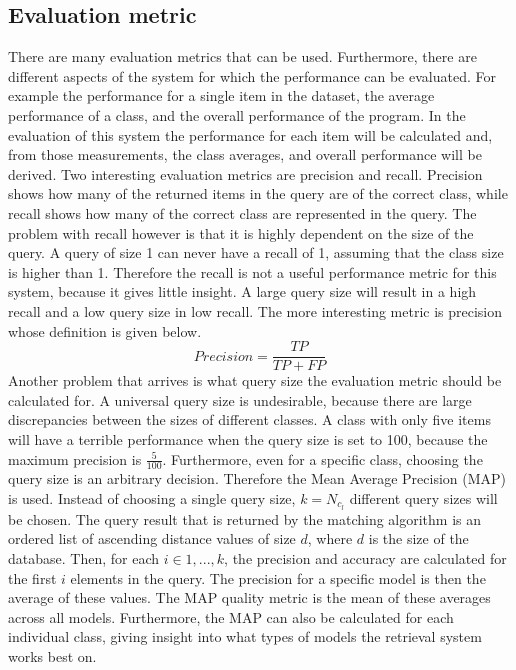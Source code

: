 \documentclass{bigdata}
\begin{document}
\subsection{Evaluation metric}
There are many evaluation metrics that can be used. Furthermore, there are different aspects of the system for which the performance can be evaluated. For example the performance for a single item in the dataset, the average performance of a class, and the overall performance of the program. In the evaluation of this system the performance for each item will be calculated and, from those measurements, the class averages, and overall performance will be derived. 
Two interesting evaluation metrics are precision and recall. Precision shows how many of the returned items in the query are of the correct class, while recall shows how many of the correct class are represented in the query. The problem with recall however is that it is highly dependent on the size of the query. A query of size 1 can never have a recall of 1, assuming that the class size is higher than 1. Therefore the recall is not a useful performance metric for this system, because it gives little insight. A large query size will result in a high recall and a low query size in low recall. The more interesting metric is precision whose definition is given below.
\begin{equation}
Precision = \frac{TP}{TP+FP}
\end{equation}
Another problem that arrives is what query size the evaluation metric should be calculated for. A universal query size is undesirable, because there are large discrepancies between the sizes of different classes. A class with only five items will have a terrible performance when the query size is set to 100, because the maximum precision is $\frac{5}{100}$. 
Furthermore, even for a specific class, choosing the query size is an arbitrary decision. Therefore the Mean Average Precision (MAP) is used. Instead of choosing a single query size, $k = N_{c_l}$ different query sizes will be chosen. The query result that is returned by the matching algorithm is an ordered list of ascending distance values of size $d$, where $d$ is the size of the database. Then, for each $i \in {1,...,k}$, the precision and accuracy are calculated for the first $i$ elements in the query. The precision for a specific model is then the average of these values. The MAP quality metric is the mean of these averages across all models. Furthermore, the MAP can also be calculated for each individual class, giving insight into what types of models the retrieval system works best on. 
\end{document}
